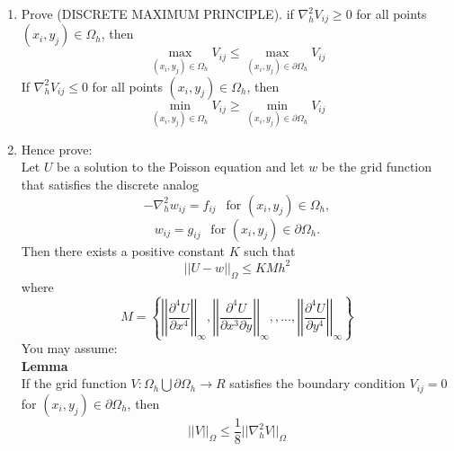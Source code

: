 \documentclass[a4paper,12pt]{article}
\theoremstyle{Qstyle}
\begin{document}
\begin{enumerate}
\begin{question}{33}
\begin{enumerate}
		\item Prove (DISCRETE MAXIMUM PRINCIPLE).
		if $\nabla^2_hV_{ij}\geq 0$ for all points $(x_i,y_j) \in \Omega_h$, then
		\[ \max_{(x_i,y_j)\in\Omega_h}V_{ij}\leq  \max_{(x_i,y_j)\in\partial\Omega_h}V_{ij}\]
		If $\nabla^2_hV_{ij}\leq 0$ for all points $(x_i,y_j) \in \Omega_h$, then
		\[ \min_{(x_i,y_j)\in\Omega_h}V_{ij}\geq  \min_{(x_i,y_j)\in\partial\Omega_h}V_{ij}\]
		\item
		Hence prove:\\
		Let $U$ be a solution to the Poisson equation and let $w$ be the grid function
		that satisfies the discrete analog
		\[-\nabla_h^2w_{ij}=f_{ij} \ \ \mbox{ for } (x_i,y_j)\in\Omega_h, \]
		\[w_{ij}=g_{ij} \ \ \mbox{ for } (x_i,y_j)\in\partial\Omega_h. \]
		Then there exists a positive constant $K$ such that
		\[||U-w||_{\Omega}\leq KMh^2 \]
		where
		\[ M=\left\{
		\left|\left|\frac{\partial^4 U}{\partial x^4} \right|\right|_{\infty},
		\left|\left|\frac{\partial^4 U}{\partial x^3\partial y} \right|\right|_{\infty},
		,...,
		\left|\left|\frac{\partial^4 U}{\partial y^4} \right|\right|_{\infty}
		\right\}
		\]
		You may assume:\\
		\textbf{Lemma}\\
		If the grid function $V:\Omega_h\bigcup\partial\Omega_h\rightarrow R$ satisfies the boundary condition $V_{ij}=0$ for $(x_i,y_j)\in \partial\Omega_h$, then
		\[||V||_{\Omega}\leq \frac{1}{8}||\nabla_h^2V||_{\Omega} \]
		\end{enumerate}
	
\end{question}

\begin{question}{33}
	

\end{question}
\end{enumerate}
\end{document}
